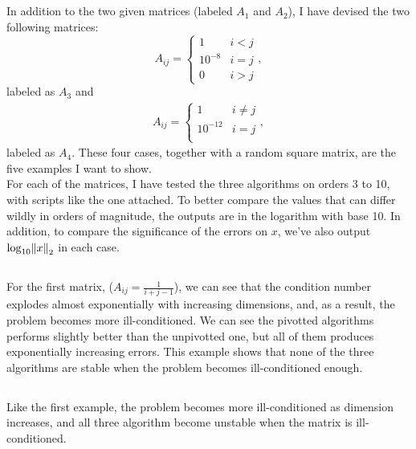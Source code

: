 \documentclass[11pt]{article}
\begin{document}
\pagebreak

\section{}
In addition to the two given matrices (labeled $A_1$ and $A_2$), I have devised the two following matrices:
\begin{equation} 
A_{ij} = 
\begin{cases}
1 &  {i < j} \\
10^{-8}  & {i = j} \\
0 &  {i > j}
\end{cases},
\nonumber\end{equation} 
labeled as $A_3$ and 
\begin{equation}\begin{split} 
A_{ij} = 
\begin{cases}
1 &  {i \neq j} \\
10^{-12}  & {i = j} \\
\end{cases},
\end{split}\nonumber\end{equation} 
labeled as $A_4$. These four cases, together with a random square matrix, are the five examples I want to show.\\[0.4cm]
For each of the matrices, I have tested the three algorithms on orders 3 to 10, with scripts like the one attached. To better compare the values that can differ wildly in orders of magnitude, the outputs are in the logarithm with base 10. In addition, to compare the significance of the errors on $x$, we've also output $\log_{10}\norm{x}_2$ in each case.
\pagebreak
\subsection{}
For the first matrix, ($A_{ij} = \frac1{i+j-1}$), we can see that the condition number explodes almost exponentially with increasing dimensions, and, as a result, the problem becomes more ill-conditioned. We can see the pivotted algorithms performs slightly better than the unpivotted one, but all of them produces exponentially increasing errors. This example shows that none of the three algorithms are stable when the problem becomes ill-conditioned enough.
\pagebreak
\subsection{}
Like the first example, the problem becomes more ill-conditioned as dimension increases, and all three algorithm become unstable when the matrix is ill-conditioned.
\pagebreak
\end{document}
